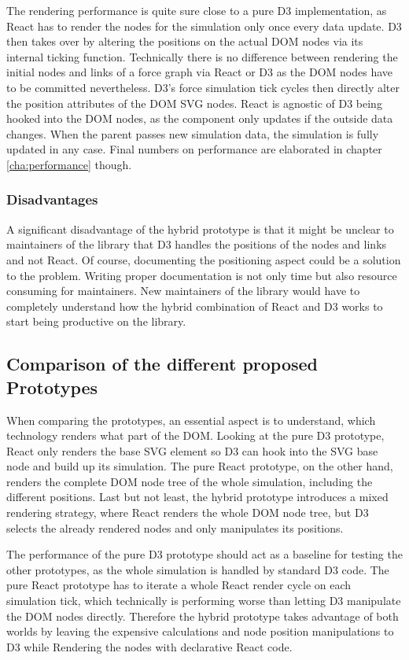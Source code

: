 The rendering performance is quite sure close to a pure D3 implementation, as React has to render the nodes for the simulation only once every data update. D3 then takes over by altering the positions on the actual DOM nodes via its internal ticking function. Technically there is no difference between rendering the initial nodes and links of a force graph via React or D3 as the DOM nodes have to be committed nevertheless. D3's force simulation tick cycles then directly alter the position attributes of the DOM SVG nodes. React is agnostic of D3 being hooked into the DOM nodes, as the component only updates if the outside data changes. When the parent passes new simulation data, the simulation is fully updated in any case. Final numbers on performance are elaborated in chapter \ref{cha:performance} though.

\subsubsection{Disadvantages}
\label{subsub:hybridDisadvantages}

A significant disadvantage of the hybrid prototype is that it might be unclear to maintainers of the library that D3 handles the positions of the nodes and links and not React. Of course, documenting the positioning aspect could be a solution to the problem. Writing proper documentation is not only time but also resource consuming for maintainers. New maintainers of the library would have to completely understand how the hybrid combination of React and D3 works to start being productive on the library.

\subsection{Comparison of the different proposed Prototypes}

When comparing the prototypes, an essential aspect is to understand, which technology renders what part of the DOM. Looking at the pure D3 prototype, React only renders the base SVG element so D3 can hook into the SVG base node and build up its simulation. The pure React prototype, on the other hand, renders the complete DOM node tree of the whole simulation, including the different positions. Last but not least, the hybrid prototype introduces a mixed rendering strategy, where React renders the whole DOM node tree, but D3 selects the already rendered nodes and only manipulates its positions.

The performance of the pure D3 prototype should act as a baseline for testing the other prototypes, as the whole simulation is handled by standard D3 code. The pure React prototype has to iterate a whole React render cycle on each simulation tick, which technically is performing worse than letting D3 manipulate the DOM nodes directly. Therefore the hybrid prototype takes advantage of both worlds by leaving the expensive calculations and node position manipulations to D3 while Rendering the nodes with declarative React code.

